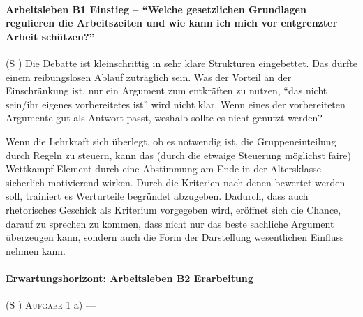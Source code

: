 \paragraph{Arbeitsleben B1 Einstieg -- \enquote{Welche gesetzlichen Grundlagen regulieren die Arbeitszeiten und wie kann ich mich vor entgrenzter Arbeit schützen?}} (\gls{S} \pageref{ARBEITSLEBEN-B1})
Die Debatte ist kleinschrittig in sehr klare Strukturen eingebettet. Das dürfte einem reibungslosen Ablauf zuträglich sein. Was der Vorteil an der Einschränkung ist, nur ein Argument zum entkräften zu nutzen, \enquote{das nicht sein/ihr eigenes vorbereitetes ist} wird nicht klar. Wenn eines der vorbereiteten Argumente gut als Antwort passt, weshalb sollte es nicht genutzt werden?  

Wenn die Lehrkraft sich überlegt, ob es notwendig ist, die Gruppeneinteilung durch Regeln zu steuern, kann das (durch die etwaige Steuerung möglichst faire) Wettkampf Element durch eine Abstimmung am Ende in der Altersklasse sicherlich motivierend wirken. Durch die Kriterien nach denen bewertet werden soll, trainiert es Werturteile begründet abzugeben. Dadurch, dass auch rhetorisches Geschick als Kriterium vorgegeben wird, eröffnet sich die Chance, darauf zu sprechen zu kommen, dass nicht nur das beste sachliche Argument überzeugen kann, sondern auch die Form der Darstellung wesentlichen Einfluss nehmen kann. 


\paragraph{Erwartungshorizont: Arbeitsleben B2 Erarbeitung} (\gls{S} \pageref{ARBEITSLEBEN-B2})
\textsc{Aufgabe 1} a) \quad ---

